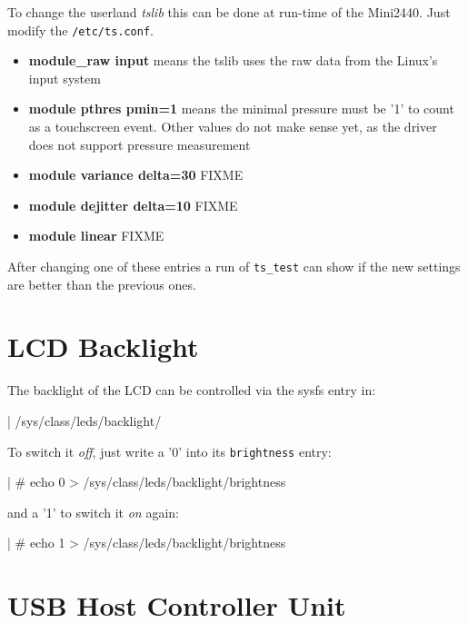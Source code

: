 To change the userland \textit{tslib} this can be done at run-time of
the Mini2440. Just modify the \texttt{/etc/ts.conf}.

\begin{itemize}
	\item \textbf{module\_raw input} means the tslib uses the raw data from
		the Linux's input system
	\item \textbf{module pthres pmin=1} means the minimal pressure must be
		'1' to count as a touchscreen event. Other values do not make
		sense yet, as the driver does not support pressure measurement
	\item \textbf{module variance delta=30} FIXME
	\item \textbf{module dejitter delta=10} FIXME
	\item \textbf{module linear} FIXME
\end{itemize}

After changing one of these entries a run of \texttt{ts\_test} can show if the
new settings are better than the previous ones.


\section{LCD Backlight}				\label{sec:BLIGHT}

The backlight of the LCD can be controlled via the sysfs entry in:

\begin{ptxshell}{|}
/sys/class/leds/backlight/
\end{ptxshell}

To switch it \textit{off}, just write a '0' into its \texttt{brightness} entry:

\begin{ptxshell}{|}
# echo 0 > /sys/class/leds/backlight/brightness
\end{ptxshell}

and a '1' to switch it \textit{on} again:

\begin{ptxshell}{|}
# echo 1 > /sys/class/leds/backlight/brightness
\end{ptxshell}


\section{USB Host Controller Unit}			\label{sec:USBHOST}


